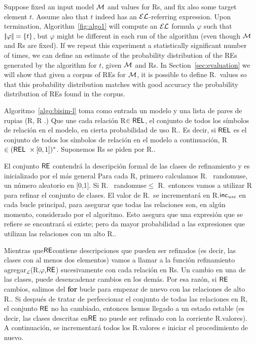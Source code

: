 Suppose fixed an input model $\mathcal{M}$ and values for Rs, and fix also some target element $t$.  Assume also that $t$ indeed has an $\mathcal{EL}$-referring expression.  Upon termination, Algorithm~\ref{fig:algo1} will compute an $\mathcal{EL}$ formula $\varphi$ such that $|\!|\varphi|\!| = \{t\}$, but $\varphi$ might be different in each run of the algorithm (even though $\mathcal{M}$ and Rs are fixed).  If we repeat this experiment a statistically significant number of times, we can define an estimate of the probability distribution of the REs generated by the algorithm for $t$, given $\mathcal{M}$ and Rs. In Section~\ref{sec:evaluation} we will show that given a corpus of REs for $\mathcal{M}$, it is possible to define R.\puse\ values so that this probability distribution matches with good accuracy the probability distribution of REs found in the corpus.  


Algoritmo~\ref{algo:bisim-l} toma como entrada un modelo y una lista de pares de rupias (R, R \puse.) Que une cada relaci\'on R$\in \textsf{REL} $, el conjunto de todos los s\'{i}mbolos de relaci\'on en el modelo, en cierta probabilidad de uso R.\puse.
Es decir, si $\textsf{REL}$ es el conjunto de todos los s\'{i}mbolos de relaci\'on en el modelo a continuaci\'on, R$\in (\textsf{REL} \ \times [0,1]) ^ * $. Suponemos Rs se piden por R.\puse.

El conjunto $\textsf{RE}$ contendr\'a la descripci\'on formal de las clases de refinamiento y es inicializado por el m\'as general 
Para cada R, primero calculamos R. \ randomuse, un n\'umero aleatorio en [0,1]. Si R. \ randomuse$\le$ R.\puse\ entonces vamos a utilizar R para refinar el conjunto de clases. El valor de R.\puse \ se incrementar\'a en R.$\textsf{inc}_\emph{use}$ en cada bucle principal, para asegurar que todas las relaciones son, en alg\'un momento, considerado por el algoritmo. Esto asegura que una expresi\'on que se refiere se encontrar\'a si existe; pero da mayor probabilidad a las expresiones que utilizan las relaciones con un alto R.\puse.

Mientras que$\textsf{RE}$contiene descripciones que pueden ser refinados (es decir, las clases con al menos dos elementos) vamos a llamar a la funci\'on refinamiento agregar$_\mathcal {L}$(R,$\varphi $,$\textsf{RE}$) sucesivamente con cada relaci\'on en Rs. Un cambio en una de las clases, puede desencadenar cambios en los dem\'as. Por esa raz\'on, si $\textsf{RE}$ cambios, salimos del \textbf {for} bucle para empezar de nuevo con las relaciones de alto R.\puse. Si despu\'es de tratar de perfeccionar el conjunto de todas las relaciones en R, el conjunto $\textsf{RE}$ no ha cambiado, entonces hemos llegado a un estado estable (es decir, las clases descritas en$\textsf{RE}$ no puede ser refinado con la corriente R.\puse valores). A continuaci\'on, se incrementar\'a todos los R.\puse valores e iniciar el procedimiento de nuevo.

